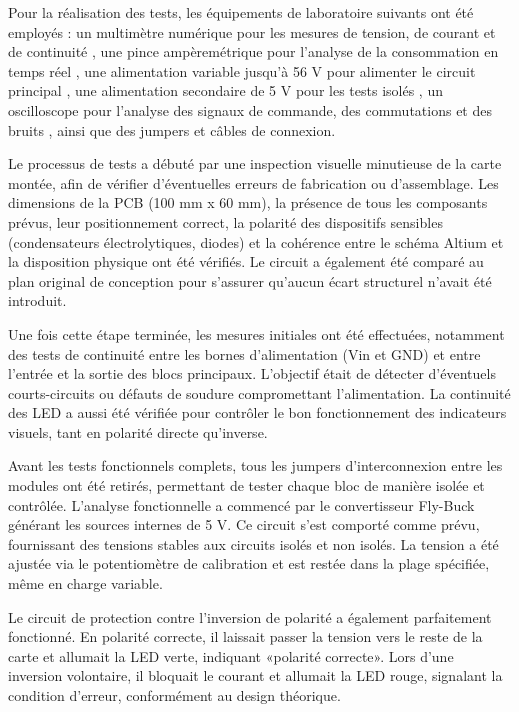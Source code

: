 Pour la réalisation des tests, les équipements de laboratoire suivants ont été employés : un multimètre numérique pour les mesures de tension, de courant et de continuité , une pince ampèremétrique pour l'analyse de la consommation en temps réel , une alimentation variable jusqu'à 56 V pour alimenter le circuit principal , une alimentation secondaire de 5 V pour les tests isolés , un oscilloscope pour l'analyse des signaux de commande, des commutations et des bruits , ainsi que des jumpers et câbles de connexion.

Le processus de tests a débuté par une inspection visuelle minutieuse de la carte montée, afin de vérifier d'éventuelles erreurs de fabrication ou d'assemblage. Les dimensions de la PCB (100 mm x 60 mm), la présence de tous les composants prévus, leur positionnement correct, la polarité des dispositifs sensibles (condensateurs électrolytiques, diodes) et la cohérence entre le schéma Altium et la disposition physique ont été vérifiés. Le circuit a également été comparé au plan original de conception pour s'assurer qu'aucun écart structurel n'avait été introduit.

Une fois cette étape terminée, les mesures initiales ont été effectuées, notamment des tests de continuité entre les bornes d'alimentation (Vin et GND) et entre l'entrée et la sortie des blocs principaux. L'objectif était de détecter d'éventuels courts-circuits ou défauts de soudure compromettant l'alimentation. La continuité des LED a aussi été vérifiée pour contrôler le bon fonctionnement des indicateurs visuels, tant en polarité directe qu'inverse.

Avant les tests fonctionnels complets, tous les jumpers d'interconnexion entre les modules ont été retirés, permettant de tester chaque bloc de manière isolée et contrôlée. L'analyse fonctionnelle a commencé par le convertisseur Fly-Buck générant les sources internes de 5 V. Ce circuit s'est comporté comme prévu, fournissant des tensions stables aux circuits isolés et non isolés. La tension a été ajustée via le potentiomètre de calibration et est restée dans la plage spécifiée, même en charge variable.

Le circuit de protection contre l'inversion de polarité a également parfaitement fonctionné. En polarité correcte, il laissait passer la tension vers le reste de la carte et allumait la LED verte, indiquant «polarité correcte». Lors d'une inversion volontaire, il bloquait le courant et allumait la LED rouge, signalant la condition d'erreur, conformément au design théorique.

